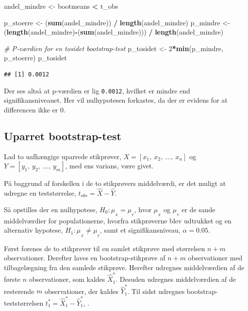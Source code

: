 \documentclass[
]{book}
\newenvironment{Shaded}{\begin{snugshade}}{\end{snugshade}}
\newcommand{\CommentTok}[1]{\textcolor[rgb]{0.56,0.35,0.01}{\textit{#1}}}
\newcommand{\DecValTok}[1]{\textcolor[rgb]{0.00,0.00,0.81}{#1}}
\newcommand{\KeywordTok}[1]{\textcolor[rgb]{0.13,0.29,0.53}{\textbf{#1}}}
\newcommand{\NormalTok}[1]{#1}
\newcommand{\OperatorTok}[1]{\textcolor[rgb]{0.81,0.36,0.00}{\textbf{#1}}}
\newcommand{\StringTok}[1]{\textcolor[rgb]{0.31,0.60,0.02}{#1}}
\theoremstyle{definition}
\theoremstyle{definition}
\theoremstyle{definition}
\theoremstyle{remark}
\begin{document}
\begin{Shaded}
\begin{Highlighting}[]
\NormalTok{andel_mindre <-}\StringTok{ }\NormalTok{bootmeans }\OperatorTok{<}\StringTok{ }\NormalTok{t_obs}

\NormalTok{p_stoerre <-}\StringTok{ }\NormalTok{(}\KeywordTok{sum}\NormalTok{(andel_mindre)) }\OperatorTok{/}\StringTok{ }\KeywordTok{length}\NormalTok{(andel_mindre)}
\NormalTok{p_mindre <-}\StringTok{ }\NormalTok{(}\KeywordTok{length}\NormalTok{(andel_mindre)}\OperatorTok{-}\NormalTok{(}\KeywordTok{sum}\NormalTok{(andel_mindre))) }\OperatorTok{/}\StringTok{ }\KeywordTok{length}\NormalTok{(andel_mindre)}

\CommentTok{# P-værdien for en tosidet bootstrap-test}
\NormalTok{p_tosidet <-}\StringTok{ }\DecValTok{2}\OperatorTok{*}\KeywordTok{min}\NormalTok{(p_mindre, p_stoerre)}
\NormalTok{p_tosidet}
\end{Highlighting}
\end{Shaded}

\begin{verbatim}
## [1] 0.0012
\end{verbatim}

Der ses altså at p-værdien er lig \texttt{0.0012}, hvilket er mindre end signifikansniveauet. Her vil nulhypotesen forkastes, da der er evidens for at differencen ikke er \(0\).

\hypertarget{uparret-bootstrap-test}{%
\subsection{Uparret bootstrap-test}\label{uparret-bootstrap-test}}

Lad to uafhængige uparrede stikprøver, \(X=[x_{1},~x_{2},~...,~x_{n}]\) og \(Y=[y_{1},~y_{2},~...,~y_{m}]\), med ens varians, være givet.

På baggrund af forskellen i de to stikprøvers middelværdi, er det muligt at udregne en teststørrelse, \(t_{obs}=\hat{X}-\hat{Y}\).

Så opstilles der en nulhypotese, \(H_0: \mu_{_X} = \mu_{_Y}\), hvor \(\mu_{_X}\) og \(\mu_{_Y}\) er de sande middelværdier for populationerne, hvorfra stikprøverne blev udtrukket og en alternativ hypotese, \(H_1: \mu_{_X} \neq \mu_{_Y}\), samt et signifikansniveau, \(\alpha = 0.05\).

Først forenes de to stikprøver til en samlet stikprøve med størrelsen \(n+m\) observationer. Derefter laves en bootstrap-stikprøve af \(n+m\) observationer med tilbagelægning fra den samlede stikprøve. Herefter udregnes middelværdien af de første \(n\) observationer, som kaldes \(\hat{X}^*_1\). Desuden udregnes middelværdien af de resterende \(m\) observationer, der kaldes \(\hat{Y}^*_1\). Til sidst udregnes bootstrap-teststørrelsen \(t^*_1=\hat{X}^*_1-\hat{Y}^*_1\), \citep{BootHypo}.
\end{document}
